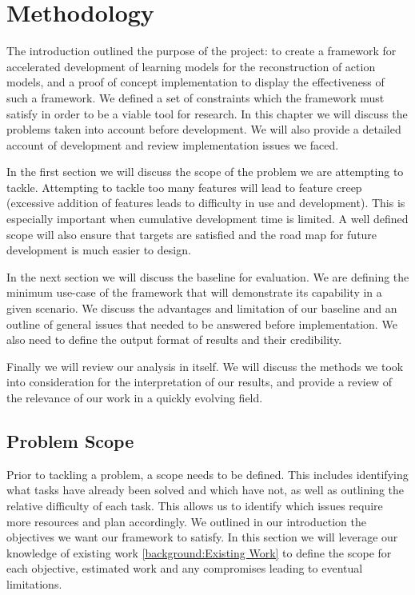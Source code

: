 \chapter{Methodology}
The introduction outlined the purpose of the project: to create a framework for accelerated development of learning models for the reconstruction of action models, and a proof of concept implementation to display the effectiveness of such a framework. We defined a set of constraints which the framework must satisfy in order to be a viable tool for research. In this chapter we will discuss the problems taken into account before development. We will also provide a detailed account of development and review implementation issues we faced.

In the first section we will discuss the scope of the problem we are attempting to tackle. Attempting to tackle too many features will lead to feature creep (excessive addition of features leads to difficulty in use and development). This is especially important when cumulative development time is limited. A well defined scope will also ensure that targets are satisfied and the road map for future development is much easier to design.

In the next section we will discuss the baseline for evaluation. We are defining the minimum use-case of the framework that will demonstrate its capability in a given scenario. We discuss the advantages and limitation of our baseline and an outline of general issues that needed to be answered before implementation. We also need to define the output format of results and their credibility.

Finally we will review our analysis in itself. We will discuss the methods we took into consideration for the interpretation of our results, and provide a review of the relevance of our work in a quickly evolving field.
\newpage


\section{Problem Scope}
Prior to tackling a problem, a scope needs to be defined. This includes identifying what tasks have already been solved and which have not, as well as outlining the relative difficulty of each task. This allows us to identify which issues require more resources and plan accordingly. We outlined in our introduction the objectives we want our framework to satisfy. In this section we will leverage our knowledge of existing work \ref{background:Existing Work} to define the scope for each objective, estimated work and any compromises leading to eventual limitations.

